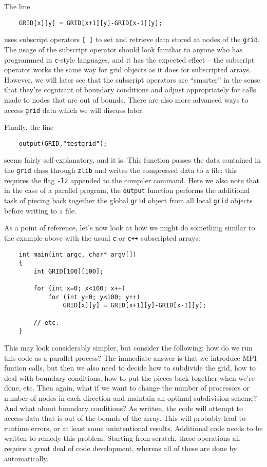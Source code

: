 The line
\begin{shadebox}
\begin{verbatim}
    GRID[x][y] = GRID[x+1][y]-GRID[x-1][y];
\end{verbatim}
\end{shadebox}
uses subscript operators {\tt [ ]} to set and retrieve data stored at nodes of the {\tt grid}.  The usage of the subscript operator should look familiar to anyone who has programmed in {\tt c}-style languages, and it has the expected effect -- the subscript operator works the same way for \MMSP grid objects as it does for subscripted arrays.  However, we will later see that the \MMSP subscript operators are ``smarter'' in the sense that they're cognizant of boundary conditions and adjust appropriately for calls made to nodes that are out of bounds.  There are also more advanced ways to access {\tt grid} data which we will discuss later.

Finally, the line 
\begin{shadebox}
\begin{verbatim}
    output(GRID,"testgrid");
\end{verbatim}
\end{shadebox}
seems fairly self-explanatory, and it is.  This function passes the data contained in the {\tt grid} class through {\tt zlib} and writes the compressed data to a file; this requires the flag {\tt -lz} appended to the compiler command.  Here we also note that in the case of a parallel program, the {\tt output} function performs the additional task of piecing back together the global {\tt grid} object from all local {\tt grid} objects before writing to a file.

As a point of reference, let's now look at how we might do something similar to the example above with the usual {\tt c} or {\tt c++} subscripted arrays:
\begin{shadebox}
\begin{verbatim}
    int main(int argc, char* argv[])
    {
        int GRID[100][100];

        for (int x=0; x<100; x++)
            for (int y=0; y<100; y++)
                GRID[x][y] = GRID[x+1][y]-GRID[x-1][y];

        // etc.
    }
\end{verbatim}
\end{shadebox}
This may look considerably simpler, but consider the following: how do we run this code as a parallel process?  The immediate answer is that we introduce MPI funtion calls, but then we also need to decide how to subdivide the grid, how to deal with boundary conditions, how to put the pieces back together when we're done, etc.  Then again, what if we want to change the number of processors or number of nodes in each direction and maintain an optimal subdivision scheme?  And what about boundary conditions?  As written, the code will attempt to access data that is out of the bounds of the array.  This will probably lead to runtime errors, or at least some unintentional results.  Additional code needs to be written to remedy this problem.  Starting from scratch, these operations all require a great deal of code development, whereas all of these are done by \MMSP automatically.


